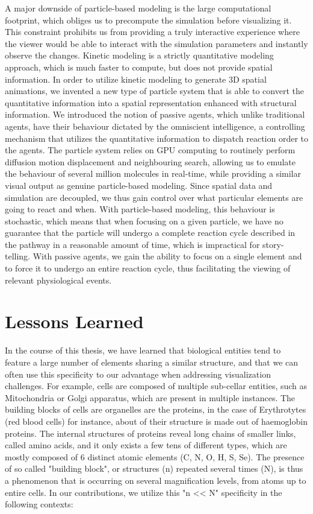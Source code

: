 A major downside of particle-based modeling is the large computational footprint, which obliges us to precompute the simulation before visualizing it.
This constraint prohibits us from providing a truly interactive experience where the viewer would be able to interact with the simulation parameters and instantly observe the changes.
Kinetic modeling is a strictly quantitative modeling approach, which is much faster to compute, but does not provide spatial information.
In order to utilize kinetic modeling to generate 3D spatial animations, we invented a new type of particle system that is able to convert the quantitative information into a spatial representation enhanced with structural information. 
We introduced the notion of passive agents, which unlike traditional agents, have their behaviour dictated by the omniscient intelligence, a controlling mechanism that utilizes the quantitative information to dispatch reaction order to the agents.
The particle system relies on GPU computing to routinely perform diffusion motion displacement and neighbouring search, allowing us to emulate the behaviour of several million molecules in real-time, while providing a similar visual output as genuine particle-based modeling.
Since spatial data and simulation are decoupled, we thus gain control over what particular elements are going to react and when.
With particle-based modeling, this behaviour is stochastic, which means that when focusing on a given particle, we have no guarantee that the particle will undergo a complete reaction cycle described in the pathway in a reasonable amount of time, which is impractical for story-telling.
With passive agents, we gain the ability to focus on a single element and to force it to undergo an entire reaction cycle, thus facilitating the viewing of relevant physiological events.

\section{Lessons Learned}

In the course of this thesis, we have learned that biological entities tend to feature a large number of elements sharing a similar structure, and that we can often use this specificity to our advantage when addressing visualization challenges.
For example, cells are composed of multiple sub-cellar entities, such as Mitochondria or Golgi apparatus, which are present in multiple instances.
The building blocks of cells are organelles are the proteins, in the case of Erythrotytes (red blood cells) for instance, about  of their structure is made out of haemoglobin proteins. 
The internal structures of proteins reveal long chains of smaller links, called amino acids, and it only exists a few tens of different types, which are mostly composed of 6 distinct atomic elements (C, N, O, H, S, Se).
The presence of so called "building block", or structures (n) repeated several times (N), is thus a phenomenon that is occurring on several magnification levels, from atoms up to entire cells.
In our contributions, we utilize this "n << N" specificity in the following contexts:

